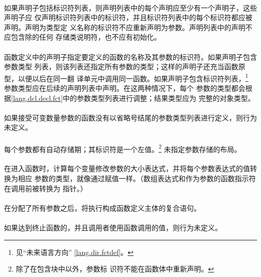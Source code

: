 {\paragraph{}
如果声明子包括标识符列表，则声明列表中的每个声明应至少有一个声明子，这些声明子应
仅声明标识符列表中的标识符，并且标识符列表中的每个标识符都应被声明。声明为类型定
义名称的标识符不应重新声明为参数。声明列表中的声明不应包含除的任何
存储类说明符，也不应有初始化。

\semantic
\paragraph{}
函数定义中的声明子指定要定义的函数的名称及其参数的标识符。如果声明子包含参数类型
列表，则该列表还指定所有参数的类型；这样的声明子还充当函数原型，以便以后在同一翻
译单元中调用同一函数。如果声明子包含标识符列表，\footnote{见``未来语言方向''
\ref{lang.dir.fctdef}。} 参数类型应在后续的声明列表中声明。在这两种情况下，每个
参数的类型都会根据\ref{lang.dcl.decl.fct}中的参数类型列表进行调整；结果类型应为
完整的对象类型。

\paragraph{}
如果接受可变数量参数的函数没有以省略号结尾的参数类型列表进行定义，则行为未定义。

\paragraph{}
每个参数都有自动存储期；其标识符是一个左值。\footnote{除了在包含块中以外，参数标
识符不能在函数体中重新声明。} 未指定参数存储的布局。

\paragraph{}
在进入函数时，计算每个变量修改参数的大小表达式，并将每个参数表达式的值转换为相应
参数的类型，就像通过赋值一样。（数组表达式和作为参数的函数指示符在调用前被转换为
指针。）

\paragraph{}
在分配了所有参数之后，将执行构成函数定义主体的复合语句。

\paragraph{}
如果达到终止函数的\tm{\}}，并且调用者使用函数调用的值，则行为未定义。

}
